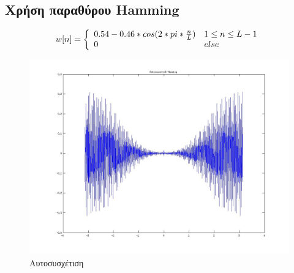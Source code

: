 \documentclass[a4paper,10pt]{article} \usepackage{anysize}
\begin{document}
\pagebreak
\subsection{Χρήση παραθύρου Hamming}
\begin{equation}
w[n]=\left\{\begin{array}{l l}
0.54 - 0.46*cos(2*pi*\frac{n}{L}) & 1 \leq n \leq L-1 \\
0 & else \\
\end{array}
\right.
\end{equation}



\begin{figure}[H]
\caption{Αυτοσυσχέτιση}
\centering
	\includegraphics[scale=0.4]{files/11-Autosusxetish-Hamming.jpg}
\end{figure}
\end{document}
